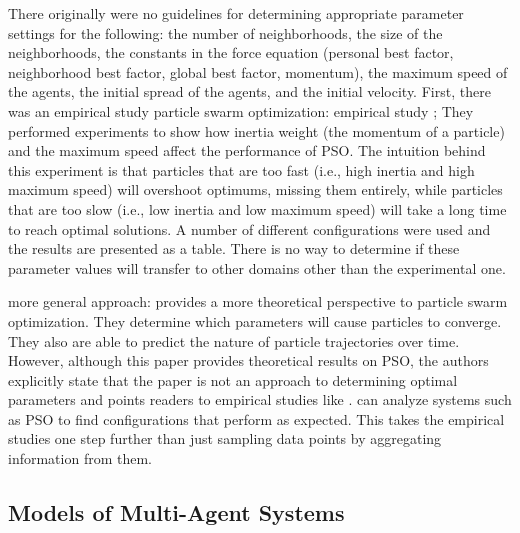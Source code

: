 There originally were no guidelines for determining appropriate parameter settings for the following: the number of neighborhoods, the size of the neighborhoods, the constants in the force equation (personal best factor, neighborhood best factor, global best factor, momentum), the maximum speed of the agents, the initial spread of the agents, and the initial velocity.
First, there was an empirical study particle swarm optimization: empirical study \cite{shi1998parameter};
They performed experiments to show how inertia weight (the momentum of a particle) and the maximum speed affect the performance of PSO.
The intuition behind this experiment is that particles that are too fast (i.e., high inertia and high maximum speed) will overshoot optimums, missing them entirely, while particles that are too slow (i.e., low inertia and low maximum speed) will take a long time to reach optimal solutions.
A number of different configurations were used and the results are presented as a table.
There is no way to determine if these parameter values will transfer to other domains other than the experimental one.

more general approach: \cite{van2006study}
provides a more theoretical perspective to particle swarm optimization.
They determine which parameters will cause particles to converge.
They also are able to predict the nature of particle trajectories over time.
However, although this paper provides theoretical results on PSO, the authors explicitly state that the paper is not an approach to determining optimal parameters and points readers to empirical studies like \cite{shi1998parameter}.
\fw can analyze systems such as PSO to find configurations that perform as expected.
This takes the empirical studies one step further than just sampling data points by aggregating information from them.

\subsection{Models of Multi-Agent Systems}

